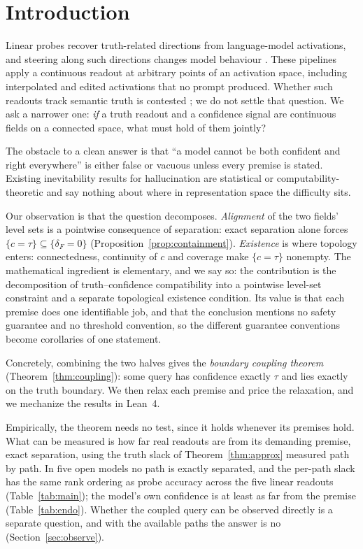 \documentclass[10pt]{article}
\theoremstyle{definition}
\theoremstyle{remark}
\newcommand{\conf}{c}
\newcommand{\dF}{\delta_{\!F}}
\begin{document}
\section{Introduction}
\label{sec:intro}

Linear probes recover truth-related directions from language-model
activations, and steering along such directions changes model behaviour
\citep{marks2024geometry,azaria2023internal,li2023inference,zou2023representation,burger2024truth}.
These pipelines apply a continuous readout at arbitrary points of an
activation space, including interpolated and edited activations that no
prompt produced. Whether such readouts track semantic truth is contested
\citep{farquhar2023challenges,levinstein2024still}; we do not settle that
question. We ask a narrower one: \emph{if} a truth readout and a
confidence signal are continuous fields on a connected space, what must
hold of them jointly?

The obstacle to a clean answer is that ``a model cannot be both
confident and right everywhere'' is either false or vacuous unless every
premise is stated. Existing inevitability results for hallucination are
statistical or computability-theoretic
\citep{kalai2024calibrated,xu2024hallucination,karbasi2025impossibility}
and say nothing about where in representation space the difficulty
sits.

Our observation is that the question decomposes. \emph{Alignment} of the
two fields' level sets is a pointwise consequence of separation: exact
separation alone forces $\{\conf=\tau\}\subseteq\{\dF=0\}$
(Proposition~\ref{prop:containment}). \emph{Existence} is where topology
enters: connectedness, continuity of $\conf$ and coverage make
$\{\conf=\tau\}$ nonempty. The mathematical ingredient is elementary,
and we say so: the contribution is the decomposition of truth--confidence
compatibility into a pointwise level-set constraint and a separate
topological existence condition. Its value is that each premise does one
identifiable job, and that the
conclusion mentions no safety guarantee and no threshold convention, so
the different guarantee conventions become corollaries of one statement.

Concretely, combining the two halves gives the \emph{boundary coupling
theorem} (Theorem~\ref{thm:coupling}): some query has confidence exactly
$\tau$ and lies exactly on the truth boundary. We then relax each premise
and price the relaxation, and we mechanize the results in Lean~4.

Empirically, the theorem needs no test, since it holds whenever its
premises hold. What can be measured is how far real readouts are from
its demanding premise, exact separation, using the truth slack of
Theorem~\ref{thm:approx} measured path by path. In five open models no
path is exactly separated, and the per-path slack has the same rank
ordering as probe accuracy across the five linear readouts
(Table~\ref{tab:main}); the model's own confidence is at least as far from
the premise (Table~\ref{tab:endo}). Whether the coupled query can be observed
directly is a separate question, and with the available paths the answer
is no (Section~\ref{sec:observe}).
\end{document}
